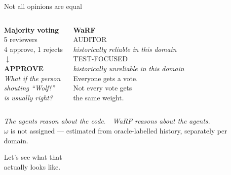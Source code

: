 \documentclass[10pt]{beamer}
\begin{document}
\begin{frame}{Not all opinions are equal}
  \begin{columns}[T]
    \textbf{Majority voting}\\[0.5em]
    \small
    5 reviewers\\
    4 approve, 1 rejects\\
    $\downarrow$\\
    \textbf{APPROVE}\\[0.8em]
    \textit{What if the person\\shouting ``Wolf!''\\is usually right?}

    \pause
    \textbf{WaRF}\\[0.5em]
    \small
    \textcolor{auditor}{AUDITOR}\\
    \small\textit{historically reliable in this domain}\\[0.6em]
    \textcolor{testfoc}{TEST-FOCUSED}\\
    \small\textit{historically unreliable in this domain}\\[0.8em]
    \alert{Everyone gets a vote.}\\
    Not every vote gets\\
    the same weight.
  \end{columns}

  \vfill
  \small
  \textit{The agents reason about the code.\ \ WaRF reasons about the agents.}\\
  \scriptsize $\omega$ is not assigned — estimated from oracle-labelled history, separately per domain.
\end{frame}

\begin{frame}[standout]
  \Large Let's see what that\\actually looks like.
\end{frame}
\addtocounter{framenumber}{1}
\end{document}
